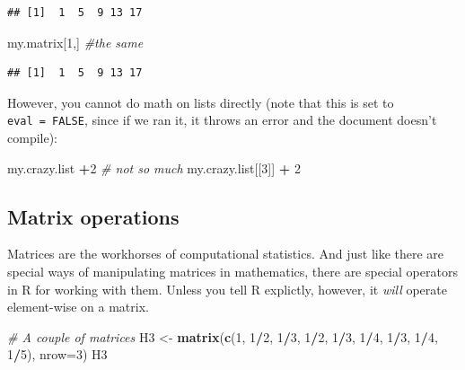 \documentclass[]{article}
\newenvironment{Shaded}{\begin{snugshade}}{\end{snugshade}}
\newcommand{\KeywordTok}[1]{\textcolor[rgb]{0.13,0.29,0.53}{\textbf{#1}}}
\newcommand{\DataTypeTok}[1]{\textcolor[rgb]{0.13,0.29,0.53}{#1}}
\newcommand{\DecValTok}[1]{\textcolor[rgb]{0.00,0.00,0.81}{#1}}
\newcommand{\StringTok}[1]{\textcolor[rgb]{0.31,0.60,0.02}{#1}}
\newcommand{\CommentTok}[1]{\textcolor[rgb]{0.56,0.35,0.01}{\textit{#1}}}
\newcommand{\OperatorTok}[1]{\textcolor[rgb]{0.81,0.36,0.00}{\textbf{#1}}}
\newcommand{\NormalTok}[1]{#1}
\begin{document}
\begin{verbatim}
## [1]  1  5  9 13 17
\end{verbatim}

\begin{Shaded}
\begin{Highlighting}[]
\NormalTok{my.matrix[}\DecValTok{1}\NormalTok{,]  }\CommentTok{#the same}
\end{Highlighting}
\end{Shaded}

\begin{verbatim}
## [1]  1  5  9 13 17
\end{verbatim}

However, you cannot do math on lists directly (note that this is set to
\texttt{eval\ =\ FALSE}, since if we ran it, it throws an error and the
document doesn't compile):

\begin{Shaded}
\begin{Highlighting}[]
\NormalTok{my.crazy.list }\OperatorTok{+}\DecValTok{2} \CommentTok{# not so much}
\NormalTok{my.crazy.list[[}\DecValTok{3}\NormalTok{]] }\OperatorTok{+}\StringTok{ }\DecValTok{2}
\end{Highlighting}
\end{Shaded}

\clearpage

\subsection{Matrix operations}\label{matrix-operations}

Matrices are the workhorses of computational statistics. And just like
there are special ways of manipulating matrices in mathematics, there
are special operators in R for working with them. Unless you tell R
explictly, however, it \emph{will} operate element-wise on a matrix.

\begin{Shaded}
\begin{Highlighting}[]
\CommentTok{# A couple of matrices}
\NormalTok{H3 <-}\StringTok{ }\KeywordTok{matrix}\NormalTok{(}\KeywordTok{c}\NormalTok{(}\DecValTok{1}\NormalTok{, }\DecValTok{1}\OperatorTok{/}\DecValTok{2}\NormalTok{, }\DecValTok{1}\OperatorTok{/}\DecValTok{3}\NormalTok{, }\DecValTok{1}\OperatorTok{/}\DecValTok{2}\NormalTok{, }\DecValTok{1}\OperatorTok{/}\DecValTok{3}\NormalTok{, }\DecValTok{1}\OperatorTok{/}\DecValTok{4}\NormalTok{, }\DecValTok{1}\OperatorTok{/}\DecValTok{3}\NormalTok{, }\DecValTok{1}\OperatorTok{/}\DecValTok{4}\NormalTok{, }\DecValTok{1}\OperatorTok{/}\DecValTok{5}\NormalTok{), }\DataTypeTok{nrow=}\DecValTok{3}\NormalTok{)}
\NormalTok{H3}
\end{Highlighting}
\end{Shaded}
\end{document}
